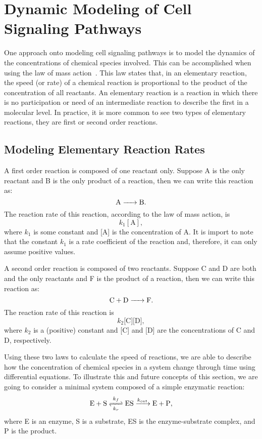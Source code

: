 \section{Dynamic Modeling of Cell Signaling Pathways}
One approach onto modeling cell signaling pathways is to model the 
dynamics of the concentrations of chemical species involved. This can be
accomplished when using the law of mass action~\cite{Voet2010}. This law 
states that, in an elementary reaction, the speed (or rate) of a 
chemical reaction is proportional to the product of the concentration of 
all reactants. An elementary reaction is a reaction in which there is no 
participation or need of an intermediate reaction to describe the first 
in a molecular level. In practice, it is more common to see two types of 
elementary reactions, they are first or second order reactions. 

\subsection{Modeling Elementary Reaction Rates}
A first order reaction is composed of one reactant only. Suppose A is 
the only reactant and B is the only product of a reaction, then we can
write this reaction as:
\begin{equation*}
\ce{
    A -> B
}.
\end{equation*}
The reaction rate of this reaction, according to the law of mass 
action, is 
\begin{equation*}
    k_1[\text{A}],
\end{equation*}
where $k_1$ is some constant and [A] is the concentration of A. It is
import to note that the constant $k_1$ is a rate coefficient of the 
reaction and, therefore, it can only assume positive values.

A second order reaction is composed of two reactants. Suppose C and D 
are both and the only reactants and F is the product of a reaction, then
we can write this reaction as:
\begin{equation*}
\ce{
    C + D -> F
}.
\end{equation*}
The reaction rate of this reaction is
\begin{equation*}
    k_2\text{[C][D]},
\end{equation*}
where $k_2$ is a (positive) constant and [C] and [D] are the 
concentrations of C and D, respectively.

Using these two laws to calculate the speed of reactions, we are able 
to describe how the concentration of chemical species in a system change 
through time using differential equations. To illustrate this and future 
concepts of this section, we are going to consider a minimal system 
composed of a simple enzymatic reaction:
\begin{equation}
\ce{
    E + S <=>[\ce{$k$_f}][\ce{$k$_r}] ES ->[\ce{$k_{cat}$}] E + P
},
\label{eq:simple_enzymatic}
\end{equation}
where E is an enzyme, S is a substrate, ES is the enzyme-substrate
complex, and P is the product.

